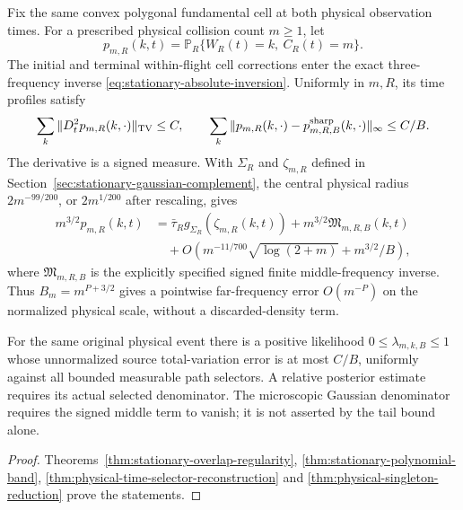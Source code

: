 \begin{maintheorem}
\label{thm:intro-exact-physical-endpoint}
Fix the same convex polygonal fundamental cell at both physical
observation times. For a prescribed physical collision count $m\ge1$,
let
\[
 p_{m,R}(k,t)=\mathbb P_R\{W_R(t)=k,\ C_R(t)=m\}.
\]
The initial and terminal within-flight cell corrections enter the exact
three-frequency inverse \eqref{eq:stationary-absolute-inversion}.
Uniformly in $m,R$, its time profiles satisfy
\[
 \sum_k\|D_t^2p_{m,R}(k,\cdot)\|_{\operatorname{TV}}\le C,
 \qquad
 \sum_k\|p_{m,R}(k,\cdot)-p^{\rm sharp}_{m,R,B}(k,\cdot)\|_\infty
                                                      \le C/B.
\]
The derivative is a signed measure. With $\Sigma_R$ and
$\zeta_{m,R}$ defined in
Section~\ref{sec:stationary-gaussian-complement}, the central physical
radius $2m^{-99/200}$, or $2m^{1/200}$ after rescaling, gives
\begin{align*}
 m^{3/2}p_{m,R}(k,t)
 &=\bar\tau_Rg_{\Sigma_R}(\zeta_{m,R}(k,t))
       +m^{3/2}\mathfrak M_{m,R,B}(k,t)\\
 &\quad+O\left(m^{-11/700}\sqrt{\log(2+m)}+m^{3/2}/B\right),
\end{align*}
where $\mathfrak M_{m,R,B}$ is the explicitly specified signed finite
middle-frequency inverse. Thus $B_m=m^{P+3/2}$ gives a pointwise
far-frequency error $O(m^{-P})$ on the normalized physical scale,
without a discarded-density term.

For the same original physical event there is a positive likelihood
$0\le\lambda_{m,k,B}\le1$ whose unnormalized source total-variation
error is at most $C/B$, uniformly against all bounded measurable path
selectors. A relative posterior estimate requires its actual selected
denominator. The microscopic Gaussian denominator requires the signed
middle term to vanish; it is not asserted by the tail bound alone.
\end{maintheorem}
\begin{proof}
Theorems~\ref{thm:stationary-overlap-regularity},
\ref{thm:stationary-polynomial-band},
\ref{thm:physical-time-selector-reconstruction} and
\ref{thm:physical-singleton-reduction} prove the statements.
\end{proof}


